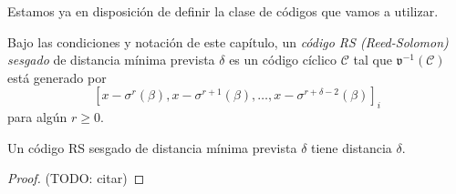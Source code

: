 Estamos ya en disposición de definir la clase de códigos que vamos a utilizar.

\begin{definition}
  Bajo las condiciones y notación de este capítulo, un \emph{código RS (Reed-Solomon) sesgado} de distancia mínima prevista \(\delta\) es un código cíclico \(\mathcal C\) tal que \(\mathfrak v^{-1}(\mathcal C)\) está generado por 
  \[
    \left[x - \sigma^r(\beta), x - \sigma^{r+1}(\beta), \dots, x - \sigma^{r+\delta-2}(\beta)\right]_i
  \] 
  para algún \(r \geq 0\).
\end{definition}

\begin{theorem}
  \label{th:distancia-skew-rs}
  Un código RS sesgado de distancia mínima prevista \(\delta\) tiene distancia \(\delta\).
\end{theorem}

\begin{proof}
  (TODO: citar)
\end{proof}